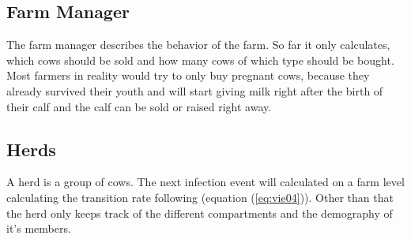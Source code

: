 \subsection{Farm Manager}\label{chap:farmManager}
The farm manager describes the behavior of the farm. So far it only calculates, which cows should be sold and how many cows of which type should be bought. Most farmers in reality would try to only buy pregnant cows, because they already survived their youth and will start giving milk right after the birth of their calf and the calf can be sold or raised right away\citep{personalCom}.
\subsection{Herds}
A herd is a group of cows. The next infection event will calculated on a farm level calculating the transition rate following \citep{VIE04} (equation (\ref{eq:vie04})). Other than that the herd only keeps track of the different compartments and the demography of it's members.
